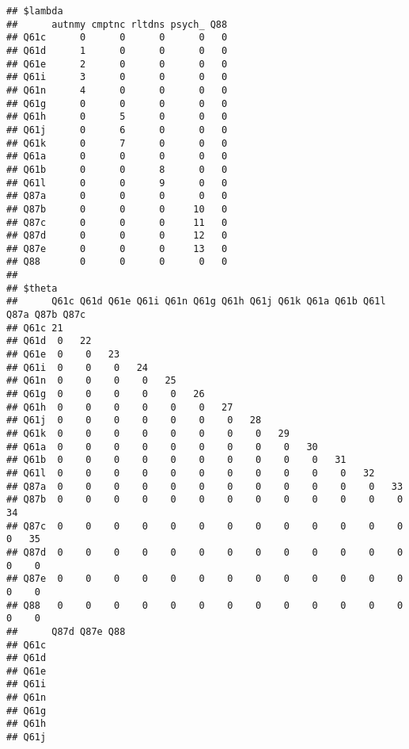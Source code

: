 \documentclass[
]{article}
\begin{document}
\begin{verbatim}
## $lambda
##      autnmy cmptnc rltdns psych_ Q88
## Q61c      0      0      0      0   0
## Q61d      1      0      0      0   0
## Q61e      2      0      0      0   0
## Q61i      3      0      0      0   0
## Q61n      4      0      0      0   0
## Q61g      0      0      0      0   0
## Q61h      0      5      0      0   0
## Q61j      0      6      0      0   0
## Q61k      0      7      0      0   0
## Q61a      0      0      0      0   0
## Q61b      0      0      8      0   0
## Q61l      0      0      9      0   0
## Q87a      0      0      0      0   0
## Q87b      0      0      0     10   0
## Q87c      0      0      0     11   0
## Q87d      0      0      0     12   0
## Q87e      0      0      0     13   0
## Q88       0      0      0      0   0
## 
## $theta
##      Q61c Q61d Q61e Q61i Q61n Q61g Q61h Q61j Q61k Q61a Q61b Q61l Q87a Q87b Q87c
## Q61c 21                                                                        
## Q61d  0   22                                                                   
## Q61e  0    0   23                                                              
## Q61i  0    0    0   24                                                         
## Q61n  0    0    0    0   25                                                    
## Q61g  0    0    0    0    0   26                                               
## Q61h  0    0    0    0    0    0   27                                          
## Q61j  0    0    0    0    0    0    0   28                                     
## Q61k  0    0    0    0    0    0    0    0   29                                
## Q61a  0    0    0    0    0    0    0    0    0   30                           
## Q61b  0    0    0    0    0    0    0    0    0    0   31                      
## Q61l  0    0    0    0    0    0    0    0    0    0    0   32                 
## Q87a  0    0    0    0    0    0    0    0    0    0    0    0   33            
## Q87b  0    0    0    0    0    0    0    0    0    0    0    0    0   34       
## Q87c  0    0    0    0    0    0    0    0    0    0    0    0    0    0   35  
## Q87d  0    0    0    0    0    0    0    0    0    0    0    0    0    0    0  
## Q87e  0    0    0    0    0    0    0    0    0    0    0    0    0    0    0  
## Q88   0    0    0    0    0    0    0    0    0    0    0    0    0    0    0  
##      Q87d Q87e Q88
## Q61c              
## Q61d              
## Q61e              
## Q61i              
## Q61n              
## Q61g              
## Q61h              
## Q61j              

\end{verbatim}
\end{document}
